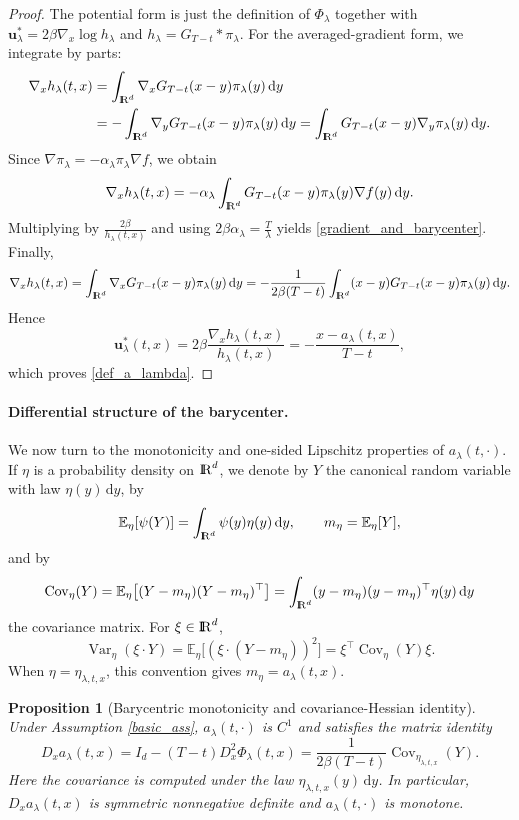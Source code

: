 \documentclass[11pt]{amsart}
\def\R{\mathrm{I\kern-0.21emR}}
\newcommand{\E}{\mathbb{E}}
\newcommand{\dd}{\,\mathrm{d}}
\numberwithin{equation}{section}
\numberwithin{figure}{section}
\newtheorem{proposition}[theorem]{Proposition}%
\theoremstyle{definition}\newtheorem{remark}[theorem]{Remark}%
\begin{document}
\begin{proof}
The potential form is just the definition of $\Phi_\lambda$ together with $\mathbf u_\lambda^* = 2\beta \nabla_x \log h_\lambda$ and $h_\lambda = G_{T-t}*\pi_\lambda$. For the averaged-gradient form, we integrate by parts:
\begin{equation*}
\begin{split}
\nabla_x h_\lambda(t,x)
&=\int_{\R^d} \nabla_x G_{T-t}(x-y)\pi_\lambda(y)\dd y\\
&=- \int_{\R^d} \nabla_y G_{T-t}(x-y)\pi_\lambda(y)\dd y 
=\int_{\R^d} G_{T-t}(x-y)\nabla_y \pi_\lambda(y)\dd y.
\end{split}
\end{equation*}
Since $\nabla \pi_\lambda = - \alpha_\lambda \pi_\lambda \nabla f$, we obtain
$$
\nabla_x h_\lambda(t,x) = - \alpha_\lambda \int_{\R^d} G_{T-t}(x-y)\pi_\lambda(y)\nabla f(y)\dd y.
$$
Multiplying by $\frac{2\beta}{h_\lambda(t,x)}$ and using $2\beta\alpha_\lambda = \frac{T}{\lambda}$ yields \eqref{gradient_and_barycenter}. Finally,
$$
\nabla_x h_\lambda(t,x)
= \int_{\R^d} \nabla_x G_{T-t}(x-y)\pi_\lambda(y)\dd y
= - \frac{1}{2\beta(T-t)} \int_{\R^d} (x-y)G_{T-t}(x-y)\pi_\lambda(y)\dd y.
$$
Hence
$$
\mathbf u_\lambda^*(t,x) = 2\beta \frac{\nabla_x h_\lambda(t,x)}{h_\lambda(t,x)} = - \frac{x - a_\lambda(t,x)}{T-t},
$$
which proves \eqref{def_a_lambda}.
\end{proof}


\paragraph{\bf Differential structure of the barycenter.}
We now turn to the monotonicity and one-sided Lipschitz properties of $a_\lambda(t,\cdot)$. If $\eta$ is a probability density on $\R^d$, we denote by $Y$ the canonical random variable with law $\eta(y)\dd y$, by
$$
\E_\eta[\psi(Y)] = \int_{\R^d}\psi(y)\eta(y)\dd y,
\qquad m_\eta = \E_\eta[Y],
$$
and by
$$
\operatorname{Cov}_\eta(Y)
= \E_\eta\big[(Y-m_\eta)(Y-m_\eta)^\top\big]
= \int_{\R^d}(y-m_\eta)(y-m_\eta)^\top\eta(y)\dd y
$$
the covariance matrix. For $\xi\in\R^d$,
$$
\operatorname{Var}_\eta(\xi\cdot Y)
= \E_\eta\big[(\xi\cdot(Y-m_\eta))^2\big]
= \xi^\top\operatorname{Cov}_\eta(Y)\xi.
$$
When $\eta=\eta_{\lambda,t,x}$, this convention gives $m_\eta=a_\lambda(t,x)$.


\begin{proposition}[Barycentric monotonicity and covariance-Hessian identity]\label{barycenter_differential}
Under Assumption \ref{basic_ass}, $a_\lambda(t,\cdot)$ is $C^1$ and satisfies the matrix identity
\begin{equation}\label{Ceta_factorization}
D_xa_\lambda(t,x)
= I_d-(T-t)D_x^2\Phi_\lambda(t,x) 
= \frac{1}{2\beta(T-t)}\operatorname{Cov}_{\eta_{\lambda,t,x}}(Y).
\end{equation}
Here the covariance is computed under the law $\eta_{\lambda,t,x}(y)\dd y$. In particular, $D_xa_\lambda(t,x)$ is symmetric nonnegative definite and $a_\lambda(t,\cdot)$ is monotone.
\end{proposition}
\end{document}
